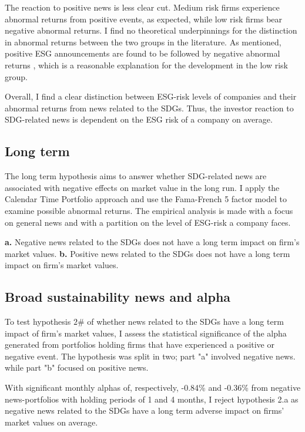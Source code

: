 The reaction to positive news is less clear cut. Medium risk firms experience abnormal returns from positive events, as expected, while low risk firms bear negative abnormal returns. I find no theoretical underpinnings for the distinction in abnormal returns between the two groups in the literature. As mentioned, positive ESG announcements are found to be followed by negative abnormal returns \cite{fisher2011voluntary}, which is a reasonable explanation for the development in the low risk group. 

Overall, I find a clear distinction between ESG-risk levels of companies and their abnormal returns from news related to the SDGs. Thus, the investor reaction to SDG-related news is dependent on the ESG risk of a company on average. 



\subsection{Long term}

The long term hypothesis aims to answer whether SDG-related news are associated with negative effects on market value in the long run. I apply the Calendar Time Portfolio approach and use the Fama-French 5 factor model to examine possible abnormal returns. The empirical analysis is made with a focus on general news and with a partition on the level of ESG-risk a company faces.  

\textbf{a.}  Negative news related to the SDGs does not have a long term impact on firm's market values.
\textbf{b.}  Positive news related to the SDGs does not have a long term impact on firm's market values.

\subsection{Broad sustainability news and alpha}

To test hypothesis $2\#$ of whether news related to the SDGs have a long term impact of firm's market values, I assess the statistical significance of the alpha generated from portfolios holding firms that have experienced a positive or negative event. The hypothesis was split in two; part "a" involved negative news. while part "b" focused on positive news. 

With significant monthly alphas of, respectively, -0.84\% and -0.36\% from negative news-portfolios with holding periods of 1 and 4 months, I reject hypothesis 2.a as negative news related to the SDGs have a long term adverse impact on firms' market values on average.   

